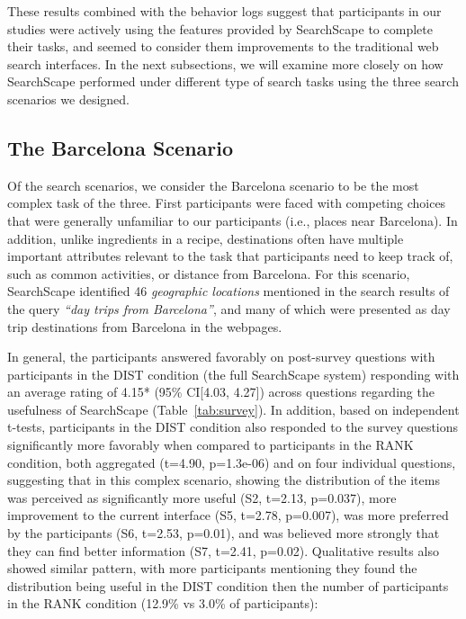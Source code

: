 These results combined with the behavior logs suggest that participants in our studies were actively using the features provided by SearchScape to complete their tasks, and seemed to consider them improvements to the traditional web search interfaces. In the next subsections, we will examine more closely on how SearchScape performed under different type of search tasks using the three search scenarios we designed. 


\subsection{The Barcelona Scenario}


Of the search scenarios, we consider the Barcelona scenario to be the most complex task of the three. First participants were faced with competing choices that were generally unfamiliar to our participants (i.e., places near Barcelona). In addition, unlike ingredients in a recipe, destinations often have multiple important attributes relevant to the task that participants need to keep track of, such as common activities, or distance from Barcelona. 
For this scenario, SearchScape identified 46 \emph{geographic locations} mentioned in the search results of the query \emph{``day trips from Barcelona''}, and many of which were presented as day trip destinations from Barcelona in the webpages. 

In general, the participants answered favorably on post-survey questions with participants in the DIST condition (the full SearchScape system) responding with an average rating of 4.15* (95\% CI[4.03, 4.27]) across questions regarding the usefulness of SearchScape (Table~\ref{tab:survey}).
In addition, based on independent t-tests, participants in the DIST condition also responded to the survey questions significantly more favorably when compared to participants in the RANK condition, both aggregated (t=4.90, p=1.3e-06) and on four individual questions, suggesting that in this complex scenario, showing the distribution of the items was perceived as significantly more useful (S2, t=2.13, p=0.037), more improvement to the current interface (S5, t=2.78, p=0.007), was more preferred by the participants (S6, t=2.53, p=0.01), and was believed more strongly that they can find better information (S7, t=2.41, p=0.02). Qualitative results also showed similar pattern, with more participants mentioning they found the distribution being useful in the DIST condition then the number of participants in the RANK condition (12.9\% vs 3.0\% of participants): 

